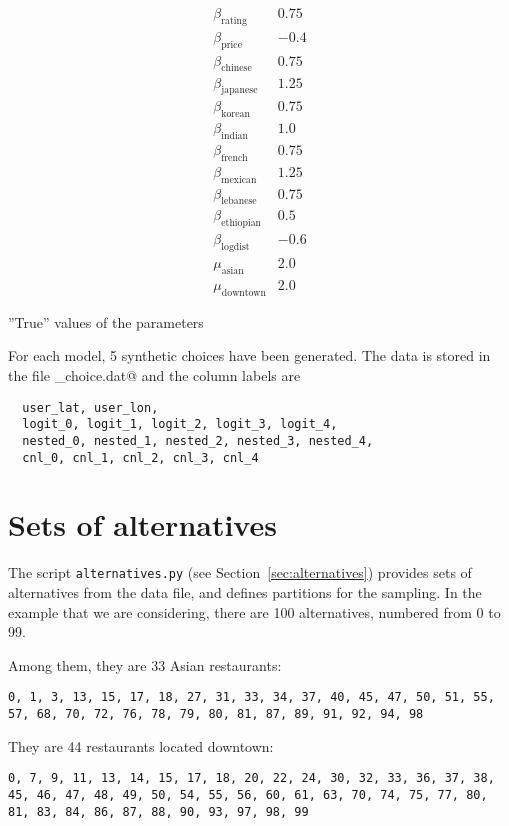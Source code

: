 \documentclass[12pt,a4paper]{article}
\begin{document}
\begin{table}[htb]
  \[
  \begin{array}{lr}
    \beta_\text{rating}   &      0.75   \\
    \beta_\text{price}   &     -0.4  \\
    \beta_\text{chinese}   &      0.75   \\
    \beta_\text{japanese}   &      1.25   \\
    \beta_\text{korean}   &      0.75   \\
    \beta_\text{indian}   &      1.0   \\
    \beta_\text{french}   &      0.75   \\
    \beta_\text{mexican}   &      1.25   \\
    \beta_\text{lebanese}   &      0.75   \\
    \beta_\text{ethiopian}   &      0.5   \\
    \beta_\text{logdist}    &    -0.6    \\
    \mu_\text{asian}   &      2.0    \\
    \mu_\text{downtown}   &      2.0
  \end{array}
  \]
  \caption{\label{tab:true_param}''True'' values of the parameters}
\end{table}

For each model, 5 synthetic choices have been generated. 
The data is stored in the file \lstinline@obs_choice.dat@ and the column labels are
\begin{lstlisting}
  user_lat, user_lon,
  logit_0, logit_1, logit_2, logit_3, logit_4,
  nested_0, nested_1, nested_2, nested_3, nested_4,
  cnl_0, cnl_1, cnl_2, cnl_3, cnl_4
\end{lstlisting}

\section{Sets of alternatives}

The script \lstinline+alternatives.py+ (see
Section~\ref{sec:alternatives}) provides sets of alternatives from the
data file, and defines partitions for the sampling. In the example
that we are considering, there are 100 alternatives, numbered from 0
to 99.


Among them, they are 33 Asian restaurants:
\begin{lstlisting}
0, 1, 3, 13, 15, 17, 18, 27, 31, 33, 34, 37, 40, 45, 47, 50, 51, 55, 57, 68, 70, 72, 76, 78, 79, 80, 81, 87, 89, 91, 92, 94, 98
\end{lstlisting}
They are 44 restaurants located downtown:
\begin{lstlisting}
0, 7, 9, 11, 13, 14, 15, 17, 18, 20, 22, 24, 30, 32, 33, 36, 37, 38, 45, 46, 47, 48, 49, 50, 54, 55, 56, 60, 61, 63, 70, 74, 75, 77, 80, 81, 83, 84, 86, 87, 88, 90, 93, 97, 98, 99
\end{lstlisting}
\end{document}
